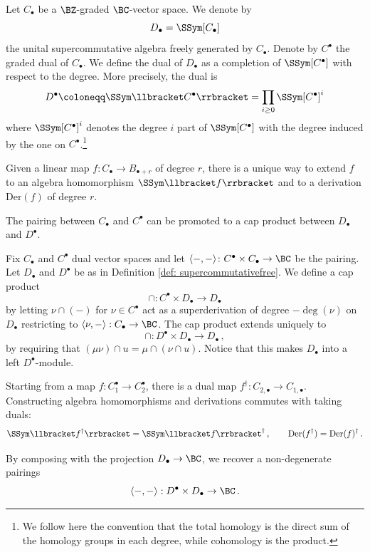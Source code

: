 \begin{definition}
\notready\label{def: supercommutativefree}
Let $C_\bullet$ be a $\BZ$-graded  $\BC$-vector space. We denote by $$D_\bullet = \SSym[C_\bullet]$$ the unital supercommutative algebra freely generated by $C_\bullet$. Denote by $C^\bullet$ the graded dual of $C_\bullet$. We define the dual of $D_\bullet$ as a completion of $\SSym[C^\bullet]$ with respect to the degree. More precisely, the dual is
\[D^\bullet\coloneqq \SSym\llbracket C^\bullet\rrbracket=\prod_{i\geq 0}\SSym[C^\bullet]^i\]
where $\SSym[C^\bullet]^i$ denotes the degree $i$ part of $\SSym[C^\bullet]$ with the degree induced by the one on $C^\bullet$.\footnote{We follow here the convention that the total homology is the direct sum of the homology groups in each degree, while cohomology is the product.}
\end{definition}
Given a linear map $f\colon C_\bullet\to B_{\bullet+r}$ of degree $r$, there is a unique way to extend $f$ to an algebra homomorphism $\SSym\llbracket f\rrbracket$ and to a derivation $\text{Der}(f)$ of degree $r$.

The pairing between $C_\bullet$ and $C^\bullet$ can be promoted to a cap product between $D_\bullet$ and $D^\bullet$.
\begin{definition}
\notready
\label{Def: pairingofV}
Fix $C_\bullet$ and $C^\bullet$ dual vector spaces and let $\langle-,-\rangle\colon C^\bullet\times C_\bullet\to \BC$ be the pairing. Let $D_\bullet$ and $D^\bullet$ be as in Definition \ref{def: supercommutativefree}.
We define a cap product
$$
\cap\colon C^\bullet\times D_\bullet\longrightarrow D_\bullet
$$
by letting $\nu\cap(-)$ for $\nu\in C^\bullet$ act as a superderivation of degree $-\deg(\nu)$ on $D_\bullet$  restricting to $\langle \nu,-\rangle: C_\bullet\to\BC$. The cap product extends uniquely to
$$
\cap\colon D^\bullet\times D_\bullet\longrightarrow D_\bullet\,,
$$
by requiring that $(\mu \nu) \cap u = \mu\cap(\nu\cap u)$. Notice that this makes $D_{\bullet}$ into a left $D^\bullet$-module.

Starting from a map $f: C_1^\bullet\to C_2^\bullet$, there is a dual map $f^{\dagger}:C_{2,\bullet}\to C_{1,\bullet}$. Constructing algebra homomorphisms and derivations commutes with taking duals: $$\SSym\llbracket f^\dagger\rrbracket = \SSym\llbracket f\rrbracket^ \dagger\,,\qquad \text{Der}(f^\dagger) = \text{Der}(f)^\dagger\,.$$

By composing with the projection $D_\bullet\to \BC$, we recover a non-degenerate pairings $$\langle -,-\rangle: D^\bullet\times D_\bullet\to \BC\,.$$
\end{definition}

